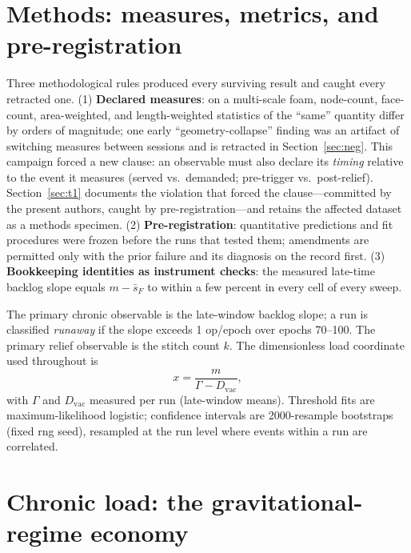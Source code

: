 \documentclass[11pt]{article}
\begin{document}
\section{Methods: measures, metrics, and pre-registration}\label{sec:methods}
Three methodological rules produced every surviving result and caught every
retracted one. (1) \textbf{Declared measures}: on a multi-scale foam,
node-count, face-count, area-weighted, and length-weighted statistics of the
``same'' quantity differ by orders of magnitude; one early
``geometry-collapse'' finding was an artifact of switching measures between
sessions and is retracted in Section~\ref{sec:neg}. This campaign forced a new
clause: an observable must also declare its \emph{timing} relative to the
event it measures (served vs.\ demanded; pre-trigger vs.\ post-relief).
Section~\ref{sec:t1} documents the violation that forced the clause---committed
by the present authors, caught by pre-registration---and retains the affected
dataset as a methods specimen. (2) \textbf{Pre-registration}: quantitative
predictions and fit procedures were frozen before the runs that tested them;
amendments are permitted only with the prior failure and its diagnosis on the
record first. (3) \textbf{Bookkeeping identities as instrument checks}: the
measured late-time backlog slope equals $m-\bar s_F$ to within a few percent
in every cell of every sweep.

The primary chronic observable is the late-window backlog slope; a run is
classified \emph{runaway} if the slope exceeds 1 op/epoch over epochs 70--100.
The primary relief observable is the stitch count $k$. The dimensionless load
coordinate used throughout is
\begin{equation}
x=\frac{m}{\Gamma-D_{\mathrm{vac}}},
\label{eq:x}
\end{equation}
with $\Gamma$ and $D_{\mathrm{vac}}$ measured per run (late-window means).
Threshold fits are maximum-likelihood logistic; confidence intervals are
2000-resample bootstraps (fixed rng seed), resampled at the run level where
events within a run are correlated.

\section{Chronic load: the gravitational-regime economy}\label{sec:chronic}
\end{document}
